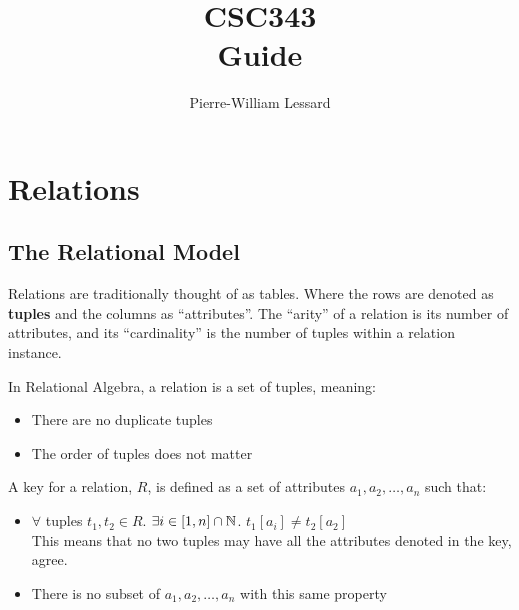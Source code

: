 \documentclass{report}
\title{\Huge{CSC343}\\Guide}
\author{\huge{Pierre-William Lessard}}
\date{}
\begin{document}
    \maketitle
    \newpage
    \tableofcontents
    \pagebreak



    \chapter{Relations}
    \section{The Relational Model}

    \vspace{.5cm}

    \par Relations are traditionally thought of as tables. Where the rows are denoted as \textbf{tuples} and the columns as ``attributes''. The ``arity'' of a relation is its number of attributes, and its ``cardinality'' is the number of tuples within a relation instance. 
    
    \par In Relational Algebra, a relation is a set of tuples, meaning: 
    \begin{itemize}
        \item There are no duplicate tuples
        \item The order of tuples does not matter
    \end{itemize} 
\vspace{.5cm}
 
    {
        A key for a relation, $R$, is defined as a set of attributes $a_1, a_2, \dots, a_n$ such that:
        \begin{itemize}
            \item $\forall$ tuples $t_1, t_2 \in R$. $\exists i \in [1,n]\cap \mathbb{N}$. $t_1 [a_i] \neq t_2 [a_2] $ \\
            This means that no two tuples may have all the attributes denoted in the key, agree. 

            \item There is no subset of $a_1, a_2, \dots, a_n$ with this same property
            
        \end{itemize}
    } \vspace{.5cm}
     
\end{document}
